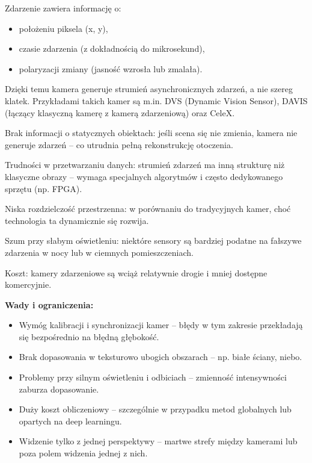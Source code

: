 \documentclass[magisterska]{pracadypl}
\begin{document}
Zdarzenie zawiera informację o:

\begin{itemize}
  \item położeniu piksela (x, y),

  \item czasie zdarzenia (z dokładnością do mikrosekund),

  \item polaryzacji zmiany (jasność wzrosła lub zmalała).
\end{itemize}

Dzięki temu kamera generuje strumień asynchronicznych zdarzeń, a nie szereg klatek. Przykładami takich kamer są m.in. DVS (Dynamic Vision Sensor), DAVIS (łączący klasyczną kamerę z kamerą zdarzeniową) oraz CeleX.

Brak informacji o statycznych obiektach: jeśli scena się nie zmienia, kamera nie generuje zdarzeń – co utrudnia pełną rekonstrukcję otoczenia.

Trudności w przetwarzaniu danych: strumień zdarzeń ma inną strukturę niż klasyczne obrazy – wymaga specjalnych algorytmów i często dedykowanego sprzętu (np. FPGA).

Niska rozdzielczość przestrzenna: w porównaniu do tradycyjnych kamer, choć technologia ta dynamicznie się rozwija.

Szum przy słabym oświetleniu: niektóre sensory są bardziej podatne na fałszywe zdarzenia w nocy lub w ciemnych pomieszczeniach.

Koszt: kamery zdarzeniowe są wciąż relatywnie drogie i mniej dostępne komercyjnie.

\begin{minipage}[t]{\textwidth}
\textbf{Wady i ograniczenia:}
\begin{itemize}
  \item Wymóg kalibracji i synchronizacji kamer – błędy w tym zakresie przekładają się bezpośrednio na błędną głębokość.

  \item Brak dopasowania w teksturowo ubogich obszarach – np. białe ściany, niebo.

  \item Problemy przy silnym oświetleniu i odbiciach – zmienność intensywności zaburza dopasowanie.

  \item Duży koszt obliczeniowy – szczególnie w przypadku metod globalnych lub opartych na deep learningu.

  \item Widzenie tylko z jednej perspektywy – martwe strefy między kamerami lub poza polem widzenia jednej z nich.
\end{itemize}
\end{minipage}
\end{document}
